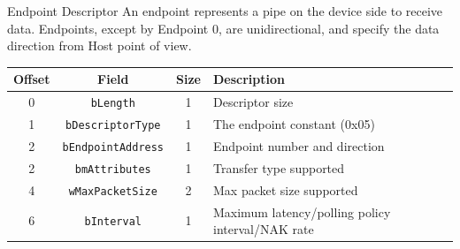 \documentclass[pdf]{beamer}
\begin{document}
\begin{frame}{Endpoint Descriptor}
  An endpoint represents a pipe on the device side to receive data.
  Endpoints, except by Endpoint 0, are unidirectional, and specify
  the data direction from Host point of view.
  \begin{table}
    \tiny
    \begin{tabular}{| c | c | c | l |}
      \hline
      \textbf{Offset} & \textbf{Field} & \textbf{Size} & \textbf{Description} \\ \hline \hline
      0 & \texttt{bLength} & 1 & Descriptor size \\ \hline
      1 & \texttt{bDescriptorType} & 1 & The endpoint constant (0x05) \\ \hline
      2 & \texttt{bEndpointAddress} & 1 & Endpoint number and direction \\ \hline
      2 & \texttt{bmAttributes} & 1 & Transfer type supported \\ \hline
      4 & \texttt{wMaxPacketSize} & 2 & Max packet size supported \\ \hline
      6 & \texttt{bInterval} & 1 & Maximum latency/polling policy interval/NAK rate \\ \hline
    \end{tabular}
  \end{table}
\end{frame}
\end{document}
